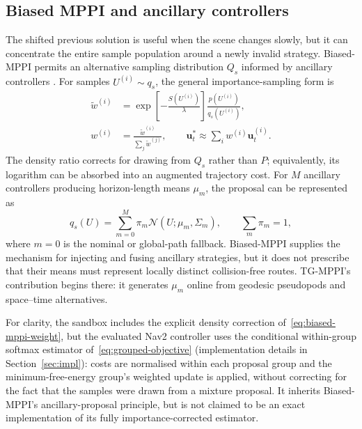 \documentclass[journal]{IEEEtran}
\begin{document}
\subsection{Biased MPPI and ancillary controllers}
The shifted previous solution is useful when the scene changes slowly, but it
can concentrate the entire sample population around a newly invalid strategy.
Biased-MPPI permits an alternative sampling distribution $Q_s$ informed by
ancillary controllers \cite{trevisan2024biased}. For samples
$U^{(i)}\sim q_s$, the general importance-sampling form is
\begin{align}
 \widetilde w^{(i)}
 &=\exp\!\left[-\frac{S(U^{(i)})}{\lambda}\right]
   \frac{p(U^{(i)})}{q_s(U^{(i)})},
 \label{eq:biased-mppi-weight}\\
 w^{(i)}&=\frac{\widetilde w^{(i)}}{\sum_j\widetilde w^{(j)}},
 \qquad
 \mathbf u_t^*\approx\sum_iw^{(i)}\mathbf u_t^{(i)}.
 \label{eq:biased-mppi-update}
\end{align}
The density ratio corrects for drawing from $Q_s$ rather than $P$; equivalently,
its logarithm can be absorbed into an augmented trajectory cost. For $M$
ancillary controllers producing horizon-length means $\mu_m$, the proposal can
be represented as
\begin{equation}
 q_s(U)=\sum_{m=0}^{M}\pi_m
 \mathcal N(U;\mu_m,\Sigma_m),\qquad \sum_m\pi_m=1,
 \label{eq:biased-mixture}
\end{equation}
where $m=0$ is the nominal or global-path fallback. Biased-MPPI supplies the
mechanism for injecting and fusing ancillary strategies, but it does not
prescribe that their means must represent locally distinct collision-free
routes. TG-MPPI's contribution begins there: it generates $\mu_m$ online from
geodesic pseudopods and space--time alternatives.

For clarity, the sandbox includes the explicit density correction
of~\eqref{eq:biased-mppi-weight}, but the evaluated Nav2 controller uses the
conditional within-group softmax estimator of~\eqref{eq:grouped-objective}
(implementation details in Section~\ref{sec:impl}): costs are normalised
within each proposal group and the minimum-free-energy group's weighted
update is applied, without correcting for the fact that the samples were
drawn from a mixture proposal. It inherits Biased-MPPI's ancillary-proposal
principle, but is not claimed to be an exact implementation of its
fully importance-corrected estimator.
\end{document}
